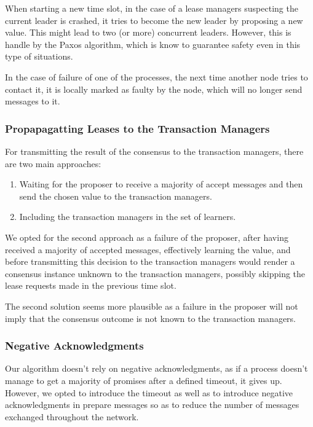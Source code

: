 \documentclass[times, 10pt,twocolumn]{article}
\begin{document}

When starting a new time slot, in the case of a lease managers suspecting the current leader is crashed, it tries to become the new leader by proposing a new value. This might lead to two (or more) concurrent leaders. However, this is handle by the Paxos algorithm, which is know to guarantee safety even in this type of situations.

In the case of failure of one of the processes, the next time another node tries to contact it, it is locally marked as faulty by the node, which will no longer send messages to it.

\subsubsection{Propapagatting Leases to the Transaction Managers}

For transmitting the result of the consensus to the transaction managers, there are two main approaches:
\begin{enumerate}
    \item Waiting for the proposer to receive a majority of accept messages and then send the chosen value to the transaction managers.
    \item Including the transaction managers in the set of learners.
\end{enumerate}

We opted for the second approach as a failure of the proposer, after having received a majority of accepted messages, effectively learning the value, and before transmitting this decision to the transaction managers would render a consensus instance unknown to the transaction managers, possibly skipping the lease requests made in the previous time slot.

The second solution seems more plausible as a failure in the proposer will not imply that the consensus outcome is not known to the transaction managers.

\subsubsection{Negative Acknowledgments}

Our algorithm doesn't rely on negative acknowledgments, as if a process doesn't manage to get a majority of promises after a defined timeout, it gives up. However, we opted to introduce the timeout as well as to introduce negative acknowledgments in prepare messages so as to reduce the number of messages exchanged throughout the network.
\end{document}
